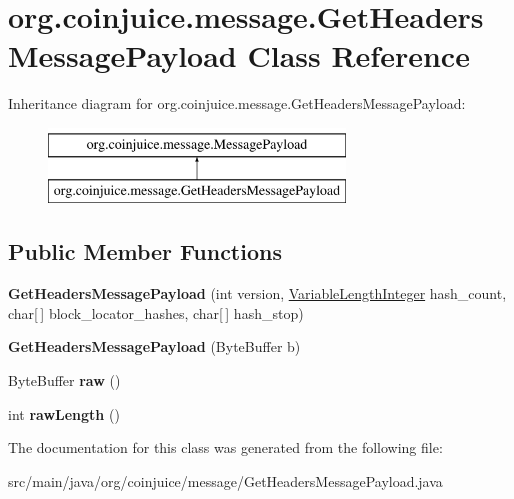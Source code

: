 \hypertarget{classorg_1_1coinjuice_1_1message_1_1_get_headers_message_payload}{\section{org.\-coinjuice.\-message.\-Get\-Headers\-Message\-Payload Class Reference}
\label{classorg_1_1coinjuice_1_1message_1_1_get_headers_message_payload}
}
Inheritance diagram for org.\-coinjuice.\-message.\-Get\-Headers\-Message\-Payload\-:\begin{figure}[H]
\begin{center}
\leavevmode
\includegraphics[height=2.000000cm]{classorg_1_1coinjuice_1_1message_1_1_get_headers_message_payload}
\end{center}
\end{figure}
\subsection*{Public Member Functions}
\begin{DoxyCompactItemize}
\item 
\hypertarget{classorg_1_1coinjuice_1_1message_1_1_get_headers_message_payload_ab82c440c2e2293a4f73610b9859b4884}{{\bfseries Get\-Headers\-Message\-Payload} (int version, \hyperlink{classorg_1_1coinjuice_1_1message_1_1field_1_1_variable_length_integer}{Variable\-Length\-Integer} hash\-\_\-count, char\mbox{[}$\,$\mbox{]} block\-\_\-locator\-\_\-hashes, char\mbox{[}$\,$\mbox{]} hash\-\_\-stop)}\label{classorg_1_1coinjuice_1_1message_1_1_get_headers_message_payload_ab82c440c2e2293a4f73610b9859b4884}

\item 
\hypertarget{classorg_1_1coinjuice_1_1message_1_1_get_headers_message_payload_afce3aed5171bef9a4841ed4c978b9c56}{{\bfseries Get\-Headers\-Message\-Payload} (Byte\-Buffer b)}\label{classorg_1_1coinjuice_1_1message_1_1_get_headers_message_payload_afce3aed5171bef9a4841ed4c978b9c56}

\item 
\hypertarget{classorg_1_1coinjuice_1_1message_1_1_get_headers_message_payload_a30a4066ed248f0032ab457e4be946ed6}{Byte\-Buffer {\bfseries raw} ()}\label{classorg_1_1coinjuice_1_1message_1_1_get_headers_message_payload_a30a4066ed248f0032ab457e4be946ed6}

\item 
\hypertarget{classorg_1_1coinjuice_1_1message_1_1_get_headers_message_payload_a5f9595b53886e0174d31d37f06d9e3a9}{int {\bfseries raw\-Length} ()}\label{classorg_1_1coinjuice_1_1message_1_1_get_headers_message_payload_a5f9595b53886e0174d31d37f06d9e3a9}

\end{DoxyCompactItemize}


The documentation for this class was generated from the following file\-:\begin{DoxyCompactItemize}
\item 
src/main/java/org/coinjuice/message/Get\-Headers\-Message\-Payload.\-java\end{DoxyCompactItemize}
